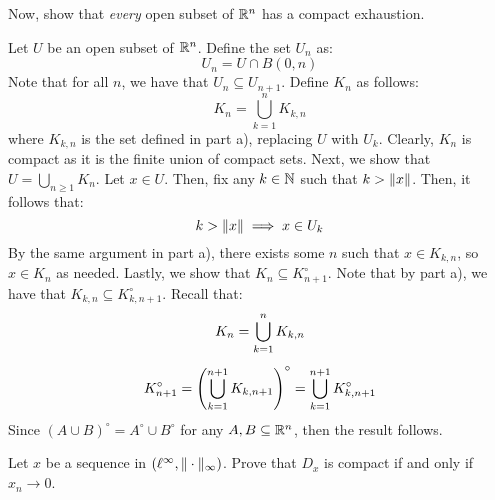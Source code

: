 \documentclass{article}
\begin{document}
\begin{qu}
    Now, show that \textit{every} open subset of $ \mathbb{R}^{n} $ has a compact exhaustion.
\end{qu}

\begin{soln}
    Let $ U $ be an open subset of $ \mathbb{R}^{n} $. Define the set $ U_{n} $ as:
    \begin{equation*}
        U_{n} = U \cap B(0, n)
    \end{equation*}
    Note that for all $ n $, we have that $ U_{n} \subseteq U_{n+1} $.
    Define $ K_{n} $ as follows:
    \begin{equation*}
        K_{n} = \bigcup_{k=1}^{n} K_{k, n}
    \end{equation*}
    where $ K_{k, n} $ is the set defined in part a), replacing $ U $ with $ U_{k} $.
    Clearly, $ K_{n} $ is compact as it is the finite union of compact sets.
    Next, we show that $ U = \bigcup_{n \geq 1} K_{n} $. \vsp
    Let $ x \in U $. Then, fix any $ k \in \mathbb{N} $ such that $ k > \|x\| $.
    Then, it follows that:
    \begin{equation*}
        k > \|x\| \implies x \in U_{k}
    \end{equation*}
    By the same argument in part a), there exists some $ n $ such that $ x \in K_{k, n} $,
    so $ x \in K_{n} $ as needed. \vsp
    Lastly, we show that $ K_{n} \subseteq K_{n+1}^{\circ} $.
    Note that by part a), we have that $ K_{k, n} \subseteq K_{k, n+1}^{\circ} $.
    Recall that:
    \begin{gather*}
        K_{n} = \bigcup_{k=1}^{n} K_{k, n} \vsp
        K_{n+1}^{\circ} = \left( \bigcup_{k=1}^{n+1}K_{k,n+1} \right)^{\circ}
        = \bigcup_{k=1}^{n+1}K_{k,n+1}^{\circ}
    \end{gather*}
    Since $ (A \cup B)^{\circ} = A^{\circ} \cup B^{\circ} $ for any
    $ A, B \subseteq \mathbb{R}^{n} $, then the result follows.
\end{soln}

\newpage
{}

\begin{qu}
    Let $ x $ be a sequence in $ (\ell^{\infty}, \|\cdot\|_{\infty}) $.
    Prove that $ D_{x} $ is compact if and only if $ x_{n} \rightarrow 0 $.
\end{qu}
\end{document}
